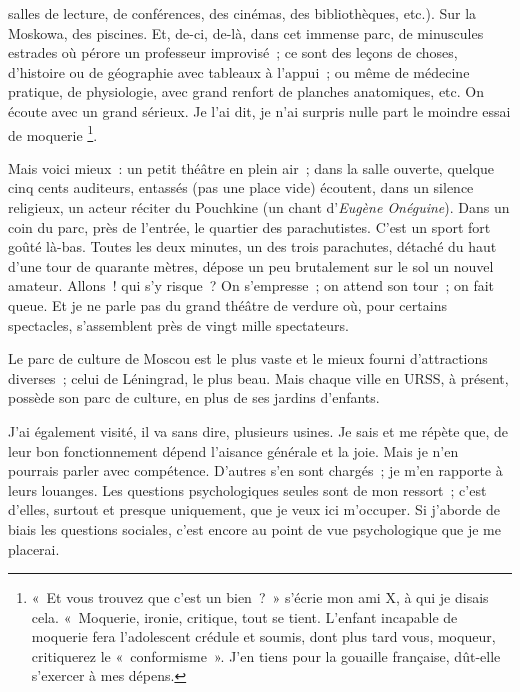 \documentclass[french,twoside]{book} %
\newcommand{\astermono}{\medskip\centerline{\color{rubric}\large\selectfont{\syms ✻}}\medskip\par}%
\begin{document}
salles de lecture, de conférences, des cinémas, des bibliothèques, etc.). Sur la Moskowa, des piscines. Et, de-ci, de-là, dans cet immense parc, de minuscules estrades où pérore un professeur improvisé ; ce sont des leçons de choses, d’histoire ou de géographie avec tableaux à l’appui ; ou même de médecine pratique, de physiologie, avec grand renfort de planches anatomiques, etc. On écoute avec un grand sérieux. Je l’ai dit, je n’ai surpris nulle part le moindre essai de moquerie \footnote{« Et vous trouvez que c’est un bien ? » s’écrie mon ami X, à qui je disais cela. « Moquerie, ironie, critique, tout se tient. L’enfant incapable de moquerie fera l’adolescent crédule et soumis, dont plus tard vous, moqueur, critiquerez le « conformisme ». J’en tiens pour la gouaille française, dût-elle s’exercer à mes dépens.}.\par
Mais voici mieux : un petit théâtre en plein air ; dans la salle ouverte, quelque cinq cents auditeurs, entassés (pas une place vide) écoutent, dans un silence religieux, un acteur réciter du Pouchkine (un chant d’\emph{Eugène Onéguine}). Dans un coin du parc, près de l’entrée, le quartier des parachutistes. C’est un sport fort goûté là-bas. Toutes les deux minutes, un des trois parachutes, détaché du haut d’une tour de quarante mètres, dépose un peu brutalement sur le sol un nouvel amateur. Allons ! qui s’y risque ? On s’empresse ; on attend son tour ; on fait queue. Et je ne parle pas du grand théâtre de verdure où, pour certains spectacles, s’assemblent près de vingt mille spectateurs.\par
Le parc de culture de Moscou est le plus vaste et le mieux fourni d’attractions diverses ; celui de Léningrad, le plus beau. Mais chaque ville en URSS, à présent, possède son parc de culture, en plus de ses jardins d’enfants.\par
J’ai également visité, il va sans dire, plusieurs usines. Je sais et me répète que, de leur bon fonctionnement dépend l’aisance générale et la joie. Mais je n’en pourrais parler avec compétence. D’autres s’en sont chargés ; je m’en rapporte à leurs louanges. Les questions psychologiques seules sont de mon ressort ; c’est d’elles, surtout et presque uniquement, que je veux ici m’occuper. Si j’aborde de biais les questions sociales, c’est encore au point de vue psychologique que je me placerai.\par

\astermono
\end{document}

